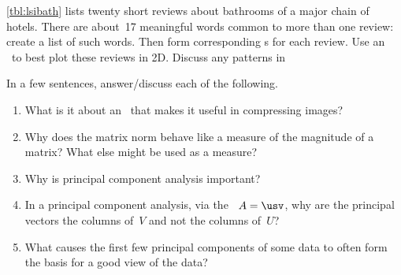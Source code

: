 \begin{reduce}
\begin{exercise} \label{ex:lsibath} 
\cref{tbl:lsibath} lists twenty short reviews about bathrooms of a major chain of hotels.
There are about~17 meaningful words common to more than one review: create a list of such words.
Then form corresponding s for each review.
Use an \svd\ to best plot these reviews in 2D.
Discuss any patterns in 
\end{exercise}

\end{reduce}





\begin{exercise}  
In a few sentences, answer\slash discuss each of the following.
\begin{enumerate}
\item What is it about an \svd\ that makes it useful in compressing images?

\item Why does the matrix norm behave like a measure of the magnitude of a matrix?  What else might be used as a measure?

\item Why is principal component analysis important?

\item In a principal component analysis, via the \svd\ \(A=\usv\), why are the principal vectors the columns of~\(V\) and not the columns of~\(U\)?

\item What causes the first few principal components of some data to often form the basis for a good view of the data?


\end{enumerate}
\end{exercise}

\endinput%

